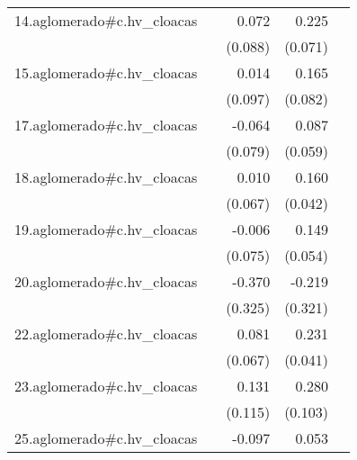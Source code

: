 {\begin{longtable}{l*{4}{D{.}{.}{-1}}}
\addlinespace
14.aglomerado#c.hv\_cloacas&                     &       0.072         &       0.225\sym{**} &                     \\
            &                     &     (0.088)         &     (0.071)         &                     \\
\addlinespace
15.aglomerado#c.hv\_cloacas&                     &       0.014         &       0.165\sym{*}  &                     \\
            &                     &     (0.097)         &     (0.082)         &                     \\
\addlinespace
17.aglomerado#c.hv\_cloacas&                     &      -0.064         &       0.087         &                     \\
            &                     &     (0.079)         &     (0.059)         &                     \\
\addlinespace
18.aglomerado#c.hv\_cloacas&                     &       0.010         &       0.160\sym{***}&                     \\
            &                     &     (0.067)         &     (0.042)         &                     \\
\addlinespace
19.aglomerado#c.hv\_cloacas&                     &      -0.006         &       0.149\sym{**} &                     \\
            &                     &     (0.075)         &     (0.054)         &                     \\
\addlinespace
20.aglomerado#c.hv\_cloacas&                     &      -0.370         &      -0.219         &                     \\
            &                     &     (0.325)         &     (0.321)         &                     \\
\addlinespace
22.aglomerado#c.hv\_cloacas&                     &       0.081         &       0.231\sym{***}&                     \\
            &                     &     (0.067)         &     (0.041)         &                     \\
\addlinespace
23.aglomerado#c.hv\_cloacas&                     &       0.131         &       0.280\sym{**} &                     \\
            &                     &     (0.115)         &     (0.103)         &                     \\
\addlinespace
25.aglomerado#c.hv\_cloacas&                     &      -0.097         &       0.053         &                     \\

\end{longtable}}
